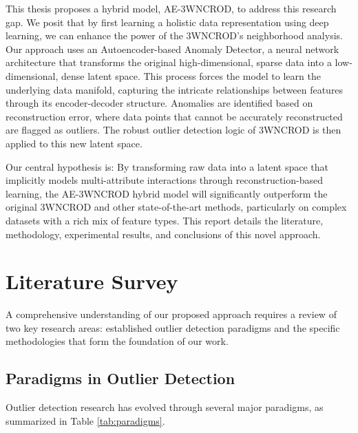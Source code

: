 \documentclass[12pt,a4paper]{article}
\begin{document}
This thesis proposes a hybrid model, AE-3WNCROD, to address this research gap. We posit that by first learning a holistic data representation using deep learning, we can enhance the power of the 3WNCROD's neighborhood analysis. Our approach uses an Autoencoder-based Anomaly Detector, a neural network architecture that transforms the original high-dimensional, sparse data into a low-dimensional, dense latent space. This process forces the model to learn the underlying data manifold, capturing the intricate relationships between features through its encoder-decoder structure. Anomalies are identified based on reconstruction error, where data points that cannot be accurately reconstructed are flagged as outliers. The robust outlier detection logic of 3WNCROD is then applied to this new latent space.

Our central hypothesis is: By transforming raw data into a latent space that implicitly models multi-attribute interactions through reconstruction-based learning, the AE-3WNCROD hybrid model will significantly outperform the original 3WNCROD and other state-of-the-art methods, particularly on complex datasets with a rich mix of feature types. This report details the literature, methodology, experimental results, and conclusions of this novel approach.

\section{Literature Survey}

A comprehensive understanding of our proposed approach requires a review of two key research areas: established outlier detection paradigms and the specific methodologies that form the foundation of our work.

\subsection{Paradigms in Outlier Detection}

Outlier detection research has evolved through several major paradigms, as summarized in Table \ref{tab:paradigms}.
\end{document}
